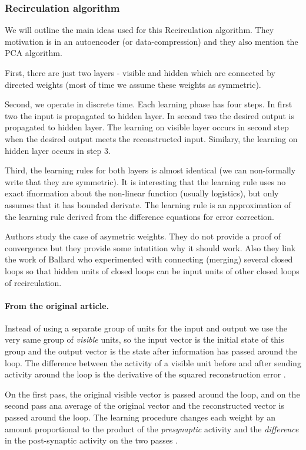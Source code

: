\subsubsection{Recirculation algorithm}
We will outline the main ideas used for this Recirculation algorithm. They motivation is in an autoencoder (or data-compression) and they also mention the PCA algorithm. 

First, there are just two layers - visible and hidden which are connected by directed weights (most of time we assume these weights as symmetric). 

Second, we operate in discrete time. Each learning phase has four steps. In first two the input is propagated to hidden layer. In second two the desired output is propagated to hidden layer. The learning on visible layer occurs in second step when the desired output meets the reconstructed input. Similary, the learning on hidden layer occurs in step 3.

Third, the learning rules for both layers is almost identical (we can non-formally write that they are symmetric). It is interesting that the learning rule uses no exact ifnormation about the non-linear function (usually logistics), but only assumes that it has bounded derivate. The learning rule is an approximation of the learning rule derived from the difference equations for error correction. 

Authors study the case of asymetric weights. They do not provide a proof of convergence but they provide some intutition why it should work. Also they link the work of Ballard who experimented with connecting (merging) several closed loops so that hidden units of closed loops can be input units of other closed loops of recirculation.

\paragraph{From the original article.}
Instead of using a separate group of units for the input and output we use the very same group of \textit{visible} units, so the input vector is the initial state of this group and the output vector is the state after information has passed around the loop. The difference between the activity of a visible unit before and after sending activity around the loop is the derivative of the squared reconstruction error \cite{hinton1988learning}.

On the first pass, the original visible vector is passed around the loop, and on the second pass ana average of the original vector and the reconstructed vector is passed around the loop. The learning procedure changes each weight by an amount proportional to the product of the \textit{presynaptic} activity and the \textit{difference} in the post-synaptic activity on the two passes  \cite{hinton1988learning}.

